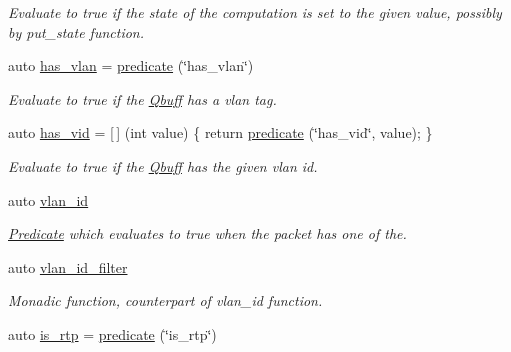 \begin{DoxyCompactItemize}
\begin{DoxyCompactList}\small\item\em Evaluate to {\ttfamily true} if the state of the computation is set to the given {\ttfamily value}, possibly by put\+\_\+state function. \end{DoxyCompactList}\item 
auto \hyperlink{namespacepfq_1_1lang_1_1anonymous__namespace_02default_8hpp_03_a1f0378ddfa90777d11ffae5fbb57b4e0}{has\+\_\+vlan} = \hyperlink{namespacepfq_1_1lang_aca9adafc436b7f851621b979fa1aaf88}{predicate} (\char`\"{}has\+\_\+vlan\char`\"{})
\begin{DoxyCompactList}\small\item\em Evaluate to {\ttfamily true} if the \hyperlink{structpfq_1_1lang_1_1Qbuff}{Qbuff} has a vlan tag. \end{DoxyCompactList}\item 
auto \hyperlink{namespacepfq_1_1lang_1_1anonymous__namespace_02default_8hpp_03_a99c204d8095fdccd50d4cb24d32e5b5b}{has\+\_\+vid} = \mbox{[}$\,$\mbox{]} (int value) \{ return \hyperlink{namespacepfq_1_1lang_aca9adafc436b7f851621b979fa1aaf88}{predicate} (\char`\"{}has\+\_\+vid\char`\"{}, value); \}
\begin{DoxyCompactList}\small\item\em Evaluate to {\ttfamily true} if the \hyperlink{structpfq_1_1lang_1_1Qbuff}{Qbuff} has the given vlan id. \end{DoxyCompactList}\item 
auto \hyperlink{namespacepfq_1_1lang_1_1anonymous__namespace_02default_8hpp_03_ad2a631020f34bf10335ebb0e79f03920}{vlan\+\_\+id}
\begin{DoxyCompactList}\small\item\em \hyperlink{structpfq_1_1lang_1_1Predicate}{Predicate} which evaluates to {\ttfamily true} when the packet has one of the. \end{DoxyCompactList}\item 
auto \hyperlink{namespacepfq_1_1lang_1_1anonymous__namespace_02default_8hpp_03_ab843ad210e98a7c8a4218efaf60f8c01}{vlan\+\_\+id\+\_\+filter}
\begin{DoxyCompactList}\small\item\em Monadic function, counterpart of {\ttfamily vlan\+\_\+id} function. \end{DoxyCompactList}\item 
auto \hyperlink{namespacepfq_1_1lang_1_1anonymous__namespace_02default_8hpp_03_afef6f6217cb5e1bc0a8d1c88dbab0307}{is\+\_\+rtp} = \hyperlink{namespacepfq_1_1lang_aca9adafc436b7f851621b979fa1aaf88}{predicate} (\char`\"{}is\+\_\+rtp\char`\"{})

\end{DoxyCompactItemize}
